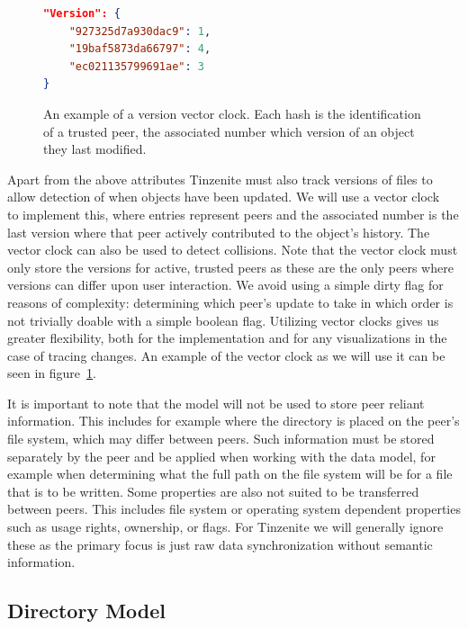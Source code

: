 \begin{figure}[htp]
    \begin{lstlisting}[language=json,firstnumber=0]
"Version": {
    "927325d7a930dac9": 1,
    "19baf5873da66797": 4,
    "ec021135799691ae": 3
}
    \end{lstlisting}
\caption[Version JSON]{An example of a version vector clock. Each hash is the identification of a trusted peer, the associated number which version of an object they last modified.}
\label{json:version_model}
\end{figure}

Apart from the above attributes Tinzenite must also track versions of files to allow detection of when objects have been updated.
We will use a vector clock~\cite{mattern1989virtual} to implement this, where entries represent peers and the associated number is the last version where that peer actively contributed to the object's history.
The vector clock can also be used to detect collisions.
Note that the vector clock must only store the versions for active, trusted peers as these are the only peers where versions can differ upon user interaction.
We avoid using a simple dirty flag for reasons of complexity: determining which peer's update to take in which order is not trivially doable with a simple boolean flag.
Utilizing vector clocks gives us greater flexibility, both for the implementation and for any visualizations in the case of tracing changes.
An example of the vector clock as we will use it can be seen in figure~\ref{json:version_model}.

It is important to note that the model will not be used to store peer reliant information.
This includes for example where the directory is placed on the peer's file system, which may differ between peers.
Such information must be stored separately by the peer and be applied when working with the data model, for example when determining what the full path on the file system will be for a file that is to be written.
Some properties are also not suited to be transferred between peers.
This includes file system or operating system dependent properties such as usage rights, ownership, or flags.
For Tinzenite we will generally ignore these as the primary focus is just raw data synchronization without semantic information.

\subsection{Directory Model}
\label{sec:dir_model}

